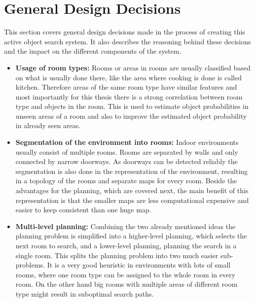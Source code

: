 \section{General Design Decisions} \label{ssec:num3}

This section covers general design decisions made in the process of creating this active object search system. It also describes the reasoning behind these decisions and the impact on the different components of the system.

\begin{itemize}
 \item \textbf{Usage of room types:} \newline
 Rooms or areas in rooms are usually classified based on what is usually done there, like the area where cooking is done is called kitchen. Therefore areas of the same room type have similar features and most importantly for this thesis there is a strong correlation between room type and objects in the room. This is used to estimate object probabilities in unseen areas of a room and also to improve the estimated object probability in already seen areas. \newline
 
 \item \textbf{Segmentation of the environment into rooms:} \newline
 Indoor environments usually consist of multiple rooms. Rooms are separated by walls and only connected by narrow doorways. As doorways can be detected reliably the segmentation is also done in the representation of the environment, resulting in a topology of the rooms and separate maps for every room. Beside the advantages for the planning, which are covered next, the main benefit of this representation is that the smaller maps are less computational expensive and easier to keep consistent than one huge map.
 \newline
 
 \item \textbf{Multi-level planning:} \newline
 Combining the two already mentioned ideas the planning problem is simplified into a higher-level planning, which selects the next room to search, and a lower-level planning, planning the search in a single room. This splits the planning problem into two much easier sub-problems. It is a very good heuristic in environments with lots of small rooms, where one room type can be assigned to the whole room in every room. On the other hand big rooms with multiple areas of different room type might result in suboptimal search paths. 
 \newline
 

\end{itemize}
